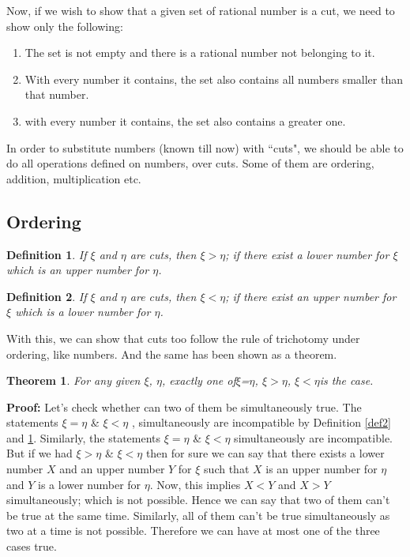 \documentclass[12pt,a4paper,final,titlepage]{article}
\newtheorem{dfn}{Definition}
\newtheorem{thm}{Theorem}
\begin{document}
\bigskip
\bigskip

Now, if we wish to show that a given set of rational number is a cut, we need to show only the following:
\begin{enumerate}
 \item The set is not empty and there is a rational number not belonging to it.
 \item With every number it contains, the set also contains all numbers smaller than that number.
 \item with every number it contains, the set also contains a greater one.
\end{enumerate}

In order to substitute numbers (known till now) with ``cuts", we should be able to do all operations defined on numbers, over cuts. Some of them are ordering, addition, multiplication etc.
\bigskip

\subsection{Ordering}
\begin{dfn}\label{def3}
If $\xi$ and $\eta$ are cuts, then $\xi > \eta$; if there exist a lower number for $\xi$ which is an upper number for $\eta$.
\end{dfn}

\begin{dfn}\label{def4}
If $\xi$ and $\eta$ are cuts, then $\xi < \eta$; if there exist an upper number for $\xi$ which is a lower number for $\eta$.
\end{dfn}

With this, we can show that cuts too follow the rule of trichotomy under ordering, like numbers. And the same has been shown as a theorem.

\begin{thm}\label{thm3}
For any given $\xi$, $\eta$, exactly one of\quad $\xi$=$\eta$, $\xi > \eta$, $\xi < \eta$\quad is the case.
\end{thm}
\textbf{Proof:} Let's check whether can two of them be simultaneously true. The statements $\xi = \eta$ \& $\xi < \eta$ , simultaneously are incompatible by Definition \ref{def2} and \ref{def3}. Similarly, the statements $\xi = \eta$ \& $\xi < \eta$ simultaneously are incompatible. But if we had $\xi>\eta$ \& $\xi<\eta$ then for sure we can say that there exists a lower number $X$ and an upper number $Y$ for $\xi$ such that $X$ is an upper number for $\eta$ and $Y$ is a lower number for $\eta$. Now, this implies $X<Y$ and $X>Y$ simultaneously; which is not possible. Hence we can say that two of them can't be true at the same time. Similarly, all of them can't be true simultaneously as two at a time is not possible. Therefore we can have at most one of the three cases true.
\end{document}
